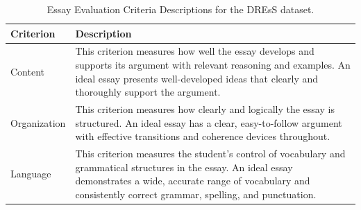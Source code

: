 \documentclass[11pt]{article}
\begin{document}
\begin{table}[!h]
\centering
\renewcommand{\arraystretch}{1.4}
\begin{tabular}{|p{3.5cm}|p{10cm}|}
\hline
\textbf{Criterion} & \textbf{Description} \\
\hline
Content &
This criterion measures how well the essay develops and supports its argument with relevant reasoning and examples. An ideal essay presents well-developed ideas that clearly and thoroughly support the argument. \\
\hline
Organization &
This criterion measures how clearly and logically the essay is structured. An ideal essay has a clear, easy-to-follow argument with effective transitions and coherence devices throughout. \\
\hline
Language &
This criterion measures the student's control of vocabulary and grammatical structures in the essay. An ideal essay demonstrates a wide, accurate range of vocabulary and consistently correct grammar, spelling, and punctuation. \\
\hline
\end{tabular}
\caption{Essay Evaluation Criteria Descriptions for the DREsS dataset.}
\label{apx:dress_criteria}
\end{table}
\end{document}
